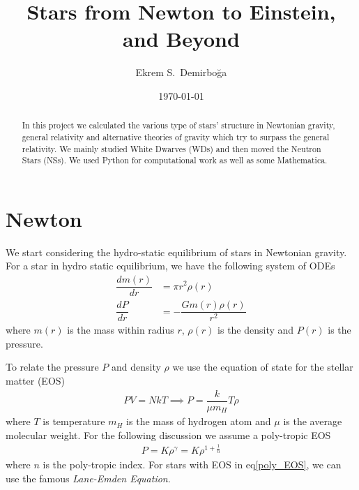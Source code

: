 \documentclass[aps,twocolumn,showpacs,preprintnumbers,nofootinbib,prl,superscriptaddress,groupedaddress]{revtex4-1}
\begin{document}
\title{Stars from Newton to Einstein, and Beyond}
\author{Ekrem S.\ Demirbo\u{g}a}
\date{\today}

\begin{abstract}
In this project we calculated the various type of stars' structure in Newtonian gravity, general relativity and alternative theories of gravity which try to surpass the general relativity. We mainly studied White Dwarves (WDs) and then moved the Neutron Stars (NSs). We used Python for computational work as well as some Mathematica. 
\end{abstract}
\maketitle


\section{Newton}
We start considering the hydro-static equilibrium of stars in Newtonian gravity. For a star in hydro static equilibrium, we have the following system of ODEs
\begin{align}\label{ODEs}
\dfrac{dm(r)}{dr} &= \pi r^2 \rho(r)\\
\dfrac{dP}{dr} &= - \dfrac{Gm(r)\rho(r)}{r^2} \nonumber
\end{align}
where $ m(r) $ is the mass within radius $ r $, $ \rho(r) $ is the density and $ P(r) $ is the pressure.

To relate the pressure $ P $ and density $ \rho $ we use the equation of state for the stellar matter (EOS)
\begin{align}\label{EOS}
	PV = NkT \implies P = \dfrac{k}{\mu m_H}T\rho
\end{align}
where $ T $ is temperature $ m_H $ is the mass of hydrogen atom and $ \mu $ is the average molecular weight. For the following discussion we assume a poly-tropic EOS
\begin{align}\label{poly_EOS}
	P = K\rho^{\gamma} = K \rho^{1 + \frac{1}{n}}  
\end{align}
where $ n $ is the poly-tropic index. For stars with EOS in eq\ref{poly_EOS}, we can use the famous \textit{Lane-Emden Equation}.
\end{document}
